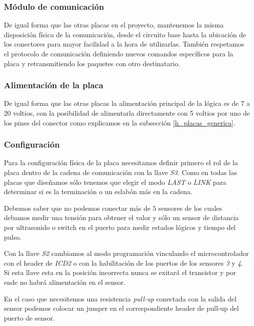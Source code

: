 \subsubsection{M\'odulo de comunicaci\'on}
\label{h_placas_sensado_comm}

De igual forma que las otras placas en el proyecto, mantenemos la misma disposici\'on f\'isica de
la comunicaci\'on, desde el circuito base hasta la ubicaci\'on de los conectores para mayor facilidad
a la hora de utilizarlas.
Tambi\'en respetamos el protocolo de comunicaci\'on definiendo nuevos comandos espec\'ificos para la
placa y retransmitiendo los paquetes con otro destinatario.

\subsubsection{Alimentaci\'on de la placa}
\label{h_placas_sensado_alimentacion}

De igual forma que las otras placas la alimentaci\'on principal de la l\'ogica es de 7 a 20 voltios,
con la posibilidad de alimentarla directamente con 5 voltios por uno de los pines del conector como
explicamos en la subsecci\'on \ref{h_placas_generica}.

\subsubsection{Configuraci\'on}
\label{h_placas_sensado_config}

Para la configuraci\'on f\'isica de la placa necesitamos definir primero el rol de la placa dentro de
la cadena de comunicaci\'on con la llave \emph{S3}.
Como en todas las placas que dise\~namos s\'olo tenemos que elegir el modo \emph{LAST} o \emph{LINK}
para determinar si es la terminaci\'on o un eslab\'on m\'as en la cadena.

Debemos saber que no podemos conectar m\'as de $5$ sensores de los cuales debamos medir una tensi\'on
para obtener el valor y s\'olo un sensor de distancia por ultrasonido o switch en el puerto para
medir estados l\'ogicos y tiempo del pulso.

Con la llave \emph{S2} cambiamos al modo programaci\'on vinculando el microcontrolador con el header
de \emph{ICD2} o con la habilitaci\'on de los puertos de los sensores \emph{3} y \emph{4}.
Si esta llave esta en la posici\'on incorrecta nunca se exitar\'a el transistor y por ende no habr\'a
alimentaci\'on en el sensor.

En el caso que necesitemos una resistencia \emph{pull-up} conectada con la salida del sensor podemos
colocar un jumper en el correspondiente header de pull-up del puerto de sensor.

